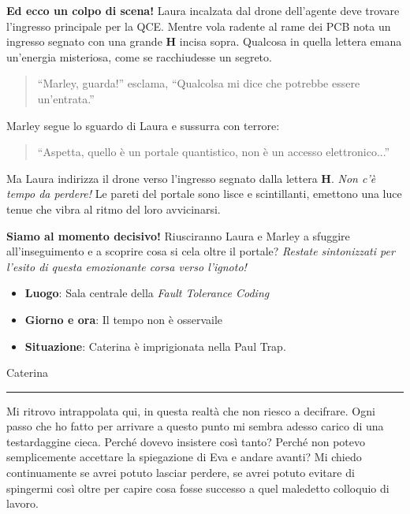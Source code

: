 \textbf{Ed ecco un colpo di scena!} Laura incalzata dal drone dell'agente deve trovare l'ingresso principale per la QCE. Mentre vola radente al rame dei PCB nota un ingresso segnato con una grande \textbf{H} incisa sopra. Qualcosa in quella lettera emana un'energia misteriosa, come se racchiudesse un segreto.

\begin{quote}
\enquote{Marley, guarda!} esclama, \enquote{Qualcolsa mi dice che potrebbe essere un'entrata.}
\end{quote}

Marley segue lo sguardo di Laura e sussurra con terrore:

\begin{quote}
\enquote{Aspetta, quello è un portale quantistico, non è un accesso elettronico...}
\end{quote}

Ma Laura indirizza il drone verso l'ingresso segnato dalla lettera \textbf{H}. \emph{Non c'è tempo da perdere!} Le pareti del portale sono lisce e scintillanti, emettono una luce tenue che vibra al ritmo del loro avvicinarsi.

\textbf{Siamo al momento decisivo!} Riusciranno Laura e Marley a sfuggire all'inseguimento e a scoprire cosa si cela oltre il portale? \emph{Restate sintonizzati per l'esito di questa emozionante corsa verso l'ignoto!}


\begin{tcolorbox}[colback=gray!5,colframe=gray!80,title=\textbf{Scheda Informativa}]
\begin{itemize}
    \item \textbf{Luogo}: Sala centrale della \emph{Fault Tolerance Coding}
    \item \textbf{Giorno e ora}: Il tempo non è osservaile
    \item \textbf{Situazione}: Caterina è imprigionata nella Paul Trap.
\end{itemize}
\end{tcolorbox}

\vspace{1em}
\begin{center}Caterina\end{center}
\hrule
\vspace{1em}

Mi ritrovo intrappolata qui, in questa realtà che non riesco a decifrare. Ogni passo che ho fatto per arrivare a questo punto mi sembra adesso carico di una testardaggine cieca. Perché dovevo insistere così tanto? Perché non potevo semplicemente accettare la spiegazione di Eva e andare avanti? Mi chiedo continuamente se avrei potuto lasciar perdere, se avrei potuto evitare di spingermi così oltre per capire cosa fosse successo a quel maledetto colloquio di lavoro.

